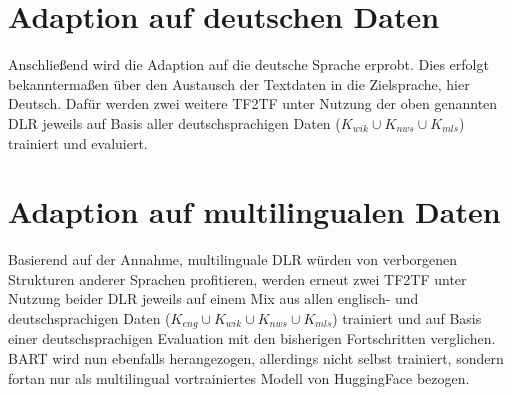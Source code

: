 \section{Adaption auf deutschen Daten}
\noindent
Anschließend wird die Adaption auf die deutsche Sprache erprobt. Dies erfolgt bekanntermaßen über den Austausch der Textdaten in die Zielsprache, hier Deutsch. Dafür werden zwei weitere \ac{TF2TF} unter Nutzung der oben genannten \ac{DLR} jeweils auf Basis aller deutschsprachigen Daten ($K_{wik} \cup K_{nws} \cup K_{mls}$) trainiert und evaluiert.


\section{Adaption auf multilingualen Daten}
\noindent
Basierend auf der Annahme, multilinguale \ac{DLR} würden von verborgenen Strukturen anderer Sprachen profitieren, werden erneut zwei \ac{TF2TF} unter Nutzung beider \ac{DLR} jeweils auf einem Mix aus allen englisch- und deutschsprachigen Daten ($K_{eng} \cup K_{wik} \cup K_{nws} \cup K_{mls}$) trainiert und auf Basis einer deutschsprachigen Evaluation mit den bisherigen Fortschritten verglichen. \ac{BART} wird nun ebenfalls herangezogen, allerdings nicht selbst trainiert, sondern fortan nur als multilingual vortrainiertes Modell von HuggingFace bezogen.
